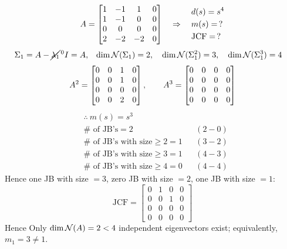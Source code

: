 \begin{example}
\leavevmode{}\[
A=\begin{bmatrix}1&-1&1&0\\1&-1&0&0\\0&0&0&0\\2&-2&-2&0\end{bmatrix}
\quad\Rightarrow\quad
\begin{aligned}
&d(s)=s^4\\
&m(s)=\,?\\
&\text{JCF}=\,?
\end{aligned}
\]
\begin{align*}
\Sigma_1&=A-\cancel{\lambda_1}^{\,0}I=A, &
\dim\mathcal{N}(\Sigma_1)&=2, \quad \dim\mathcal{N}(\Sigma_1^2)=3, \quad \dim\mathcal{N}(\Sigma_1^3)=4
\end{align*}
\[
A^2=\begin{bmatrix}0&0&1&0\\0&0&1&0\\0&0&0&0\\0&0&2&0\end{bmatrix},\qquad
A^3=\begin{bmatrix}0&0&0&0\\0&0&0&0\\0&0&0&0\\0&0&0&0\end{bmatrix}
\]
\begin{align*}
&\therefore\ m(s)=s^3\\
&\#\text{ of JB's}=2 &&(2-0)\\
&\#\text{ of JB's with size}\ge2=1 &&(3-2)\\
&\#\text{ of JB's with size}\ge3=1 &&(4-3)\\
&\#\text{ of JB's with size}\ge4=0 &&(4-4)
\end{align*}
Hence one JB with size $=3$, zero JB with size $=2$, one JB with size $=1$:
\[
\text{JCF}=\left[\begin{array}{ccc|c}0&1&0&0\\0&0&1&0\\0&0&0&0\\\hline0&0&0&0\end{array}\right]
\]
Hence  Only $\dim\mathcal{N}(A)=2<4$ independent eigenvectors exist; equivalently, $m_1=3\neq1$.
\end{example}

